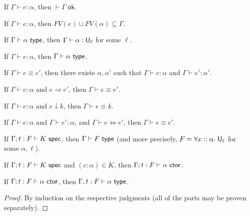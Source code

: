 \begin{lemma}[Regularity]\label{thm:reg}
\begin{thmlist}
\item If $\Gamma\vdash e:\alpha$, then $\vdash\Gamma\;\mathsf{ok}$.
\item If $\Gamma\vdash e:\alpha$, then $FV(e)\cup FV(\alpha)\subseteq\Gamma$.
\item If $\Gamma\vdash\alpha\type$, then $\Gamma\vdash\alpha:\U_\ell$ for some $\ell$.
\item If $\Gamma\vdash e:\alpha$, then $\Gamma\vdash\alpha\type$.
\item\label{item:defeq_reg2} If $\Gamma\vdash e\equiv e'$, then there exists $\alpha,\alpha'$ such that $\Gamma\vdash e:\alpha$ and $\Gamma\vdash e':\alpha'$.
\item If $\Gamma\vdash e:\alpha$ and $e\rightsquigarrow e'$, then $\Gamma\vdash e\equiv e'$.
\item If $\Gamma\vdash e:\alpha$ and $e\downarrow k$, then $\Gamma\vdash e\equiv k$.
\item\label{item:alg_defn} If $\Gamma\vdash e:\alpha$ and $\Gamma\vdash e':\alpha$, and $\Gamma\vdash e\Leftrightarrow e'$, then $\Gamma\vdash e\equiv e'$.
\item If $\Gamma;t:F\vdash K\spec$, then $\Gamma\vdash F\type$ (and more precisely, $F=\forall x::\alpha.\;\mathsf{U}_\ell$ for some $\alpha,\ell$).
\item If $\Gamma;t:F\vdash K\spec$ and $(c:\alpha)\in K$, then $\Gamma;t:F\vdash\alpha\ctor$.
\item If $\Gamma;t:F\vdash \alpha\ctor$, then $\Gamma,t:F\vdash\alpha\type$.
\end{thmlist}
\end{lemma}
\begin{proof}
By induction on the respective judgments (all of the parts may be proven separately).
\end{proof}

